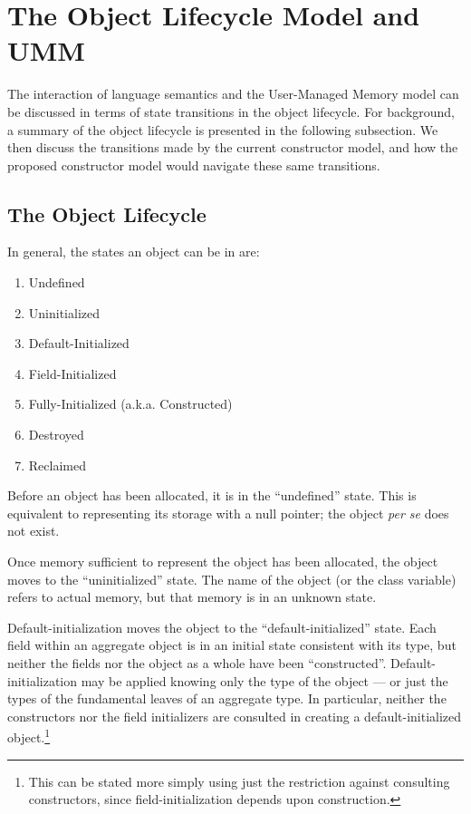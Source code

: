\section{The Object Lifecycle Model and UMM}
\label{Objects}


The interaction of language semantics and the User-Managed Memory model can be discussed
in terms of state transitions in the object lifecycle.  For background, a summary of the
object lifecycle is presented in the following subsection.  We then discuss the
transitions made by the current constructor model, and how the proposed constructor model
would navigate these same transitions.


\subsection{The Object Lifecycle}

In general, the states an object can be in are:
\begin{enumerate}
\item Undefined
\item Uninitialized
\item Default-Initialized
\item Field-Initialized
\item Fully-Initialized (a.k.a. Constructed)
\item Destroyed
\item Reclaimed
\end{enumerate}

Before an object has been allocated, it is in the ``undefined'' state.  This is
equivalent to representing its storage with a null pointer; the object {\it per
se} does not exist.

Once memory sufficient to represent the object has been allocated, the object
moves to the ``uninitialized'' state.  The name of the object (or the class
variable) refers to actual memory, but that memory is in an unknown state.

Default-initialization moves the object to the ``default-initialized'' state.  Each
field within an aggregate object is in an initial state consistent with its type,
but neither the fields nor the object as a whole have been ``constructed''.
Default-initialization may be applied knowing only the type of the object --- or
just the types of the fundamental leaves of an aggregate type.  In particular,
neither the constructors nor the field initializers are consulted in creating a
default-initialized object.\footnote{This can be stated more simply using just the
  restriction against consulting constructors, since field-initialization
  depends upon construction.}

